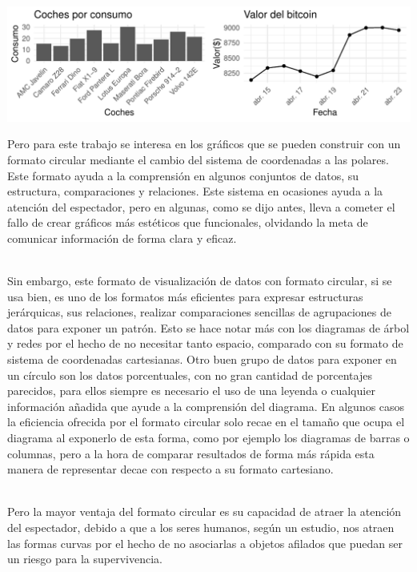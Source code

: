 \documentclass{article}\usepackage[]{graphicx}\usepackage[]{color}
\makeatletter
\def\maxwidth{ %
  \ifdim\Gin@nat@width>\linewidth
    \linewidth
  \else
    \Gin@nat@width
  \fi
}
\newenvironment{knitrout}{}{} %
\makeatother
\begin{document}
\begin{knitrout}
\color{fgcolor}

{\centering \includegraphics[width=\maxwidth]{figure/examples_carte-1} 

}



\end{knitrout}
Pero para este trabajo se interesa en los gr\'aficos que se pueden construir con un formato circular mediante el cambio del sistema de coordenadas a las polares\cite{coord_polar}. Este formato ayuda a la comprensi\'on en algunos conjuntos de datos, su estructura, comparaciones y relaciones. Este sistema en ocasiones ayuda a la atenci\'on del espectador, pero en algunas, como se dijo antes, lleva a cometer el fallo de crear gr\'aficos m\'as est\'eticos que funcionales, olvidando la meta de comunicar informaci\'on de forma clara y eficaz.~\\~\par
Sin embargo, este formato de visualizaci\'on de datos con formato circular, si se usa bien, es uno de los formatos m\'as eficientes para expresar estructuras jer\'arquicas, sus relaciones, realizar comparaciones sencillas de agrupaciones de datos para exponer un patr\'on. Esto se hace notar m\'as con los diagramas de \'arbol y redes por el hecho de no necesitar tanto espacio, comparado con su formato de sistema de coordenadas cartesianas. Otro buen grupo de datos para exponer en un c\'irculo son los datos porcentuales, con no gran cantidad de porcentajes parecidos, para ellos siempre es necesario el uso de una leyenda o cualquier informaci\'on a\~nadida que ayude a la comprensi\'on del diagrama.
\clearpage
En algunos casos la eficiencia ofrecida por el formato circular solo recae en el tama\~no que ocupa el diagrama al exponerlo de esta forma, como por ejemplo los diagramas de barras o columnas, pero a la hora de comparar resultados de forma m\'as r\'apida esta manera de representar decae con respecto a su formato cartesiano.~\\~\par
Pero la mayor ventaja del formato circular es su capacidad de atraer la atenci\'on del espectador, debido a que a los seres humanos, seg\'un un estudio\cite{psicologo}, nos atraen las formas curvas por el hecho de no asociarlas a objetos afilados que puedan ser un riesgo para la supervivencia.~\\
\end{document}
